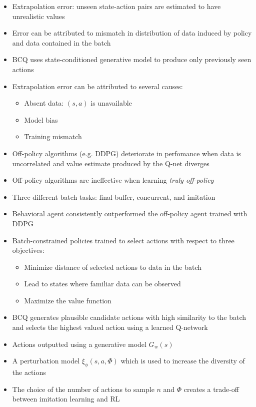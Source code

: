 \begin{itemize}
  \item Extrapolation error: unseen state-action pairs are estimated to have unrealistic values
  \item Error can be attributed to mismatch in distribution of data induced by policy and data contained in the batch
  \item BCQ uses state-conditioned generative model to produce only previously seen actions
  \item Extrapolation error can be attributed to several causes:
  \begin{itemize}
    \item Absent data: $(s,a)$ is unavailable
    \item Model bias
    \item Training mismatch
  \end{itemize}
  \item Off-policy algorithms (e.g. DDPG) deteriorate in perfomance when data is uncorrelated and value estimate produced by the Q-net diverges
  \item Off-policy algorithms are ineffective when learning \textit{truly off-policy}
  \item Three different batch tasks: final buffer, concurrent, and imitation
  \item Behavioral agent consistently outperformed the off-policy agent trained with DDPG
  \item Batch-constrained policies trained to select actions with respect to three objectives:
  \begin{itemize}
    \item Minimize distance of selected actions to data in the batch
    \item Lead to states where familiar data can be observed
    \item Maximize the value function
  \end{itemize}
  \item BCQ generates plausible candidate actions with high similarity to the batch and selects the highest valued action using a learned Q-network
  \item Actions outputted using a generative model $G_{w}(s)$
  \item A perturbation model $\xi_{\phi}(s,a,\Phi)$ which is used to increase the diversity of the actions
  \item The choice of the number of actions to sample $n$ and $\Phi$ creates a trade-off between imitation learning and RL

\end{itemize}
